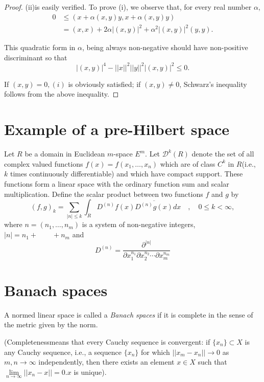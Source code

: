 \begin{proof}
 (ii)\pageoriginale is easily verified. To prove (i), we observe that, for every
 real number $\alpha$, 
 \begin{align*}
  0 & \le (x + \alpha (x, y)y, x + \alpha (x, y)y)\\
  & = (x, x) + 2 \alpha | (x, y) |^2 + \alpha^2 |(x, y)|^2 (y, y).
 \end{align*}
 
 This quadratic form in $\alpha$, being always non-negative should
 have non-positive discriminant so that 
 $$
 | (x, y)|^4 - || x||^2 ||y||^2 | (x, y) |^2 \le 0.
 $$

 If $(x, y) = 0, (i)$ is obviously satisfied; if $(x, y) \ne 0$,
 Schwarz's inequality follows from the above inequality. 
\end{proof}

\section{Example of a pre-Hilbert space}\label{chap1:sec4}

Let $R$ be a domain in Euclidean $m$-space $E^m$. Let $\mathscr{D}^k
(R)$ denote the set of all complex valued functions $f(x) = f(x_1,
\ldots, x_n)$ which are of class $C^k$ in $R$(i.e., $k$ times
continuously differentiable) and which have compact support. These
functions form a linear space with the ordinary function sum and
scalar multiplication. Define the scalar product between two functions
$f$ and $g$ by 
$$
(f, g)_k = \sum_{|n|\le k} \int_R D^{(n)} f(x) \overline{D^{(n)} g(x)}
dx \quad, \quad 0 \le k < \infty, 
$$
where $n = (n_1, \ldots, n_m)$ is a system of non-negative integers,
$|n| = n_1 + \qquad + n_m$ and 
$$
D^{(n)} = \frac{\partial^{|n|}} {\partial x_1^{n_1} \partial x_2^{n_2}
 \cdots \partial x_m^{n_m}} 
$$

\section{Banach spaces}\label{chap1:sec5}

\begin{defi*}%
 A normed linear space is called a {\em Banach spaces} if it is
 complete in the sense of the metric given by the norm. 

 (Completeness\pageoriginale means that every Cauchy sequence is convergent: if
 $\{x_n\} \subset X$ is any Cauchy sequence, i.e., a sequence
 $\{x_n\}$ for which $|| x_m - x_n|| \to 0$ as $m, n \to \infty$
 independently, then there exists an element $x \in X$ such that
 $\lim \limits_{n \to \infty} || x_n - x|| = 0. x$ is unique). 
\end{defi*}

